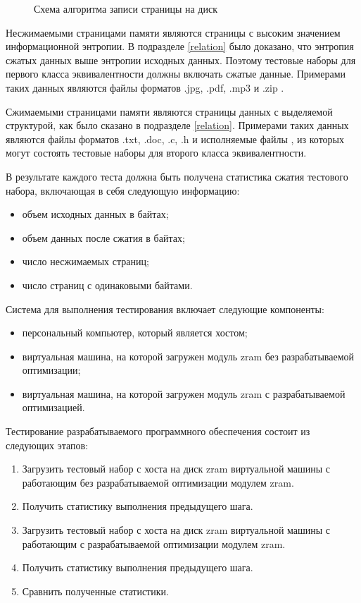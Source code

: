 \begin{figure}[H]
\begin{center}
	\end{center}
	\captionsetup{justification=centering}
	\caption{Схема алгоритма записи страницы на диск}
	\label{img:write-page}
\end{figure}

Несжимаемыми страницами памяти являются страницы с высоким значением информационной энтропии. В подразделе \ref{relation} было доказано, что энтропия сжатых данных выше энтропии исходных данных. Поэтому тестовые наборы для первого класса эквивалентности должны включать сжатые данные. Примерами таких данных являются файлы форматов .jpg, .pdf, .mp3 и .zip \cite{formats}.

Сжимаемыми страницами памяти являются страницы данных с выделяемой структурой, как было сказано в подразделе \ref{relation}. Примерами таких данных являются файлы форматов .txt, .doc, .c, .h и исполняемые файлы \cite{good-compression}, из которых могут состоять тестовые наборы для второго класса эквивалентности.

В результате каждого теста должна быть получена статистика сжатия тестового набора, включающая в себя следующую информацию:

\begin{itemize}
	\item объем исходных данных в байтах;
	\item объем данных после сжатия в байтах;
	\item число несжимаемых страниц;
	\item число страниц с одинаковыми байтами.
\end{itemize}

Система для выполнения тестирования включает следующие компоненты:

\begin{itemize}
	\item персональный компьютер, который является хостом;
	\item виртуальная машина, на которой загружен модуль zram без разрабатываемой оптимизации;
	\item виртуальная машина, на которой загружен модуль zram с разрабатываемой оптимизацией.
\end{itemize}

Тестирование разрабатываемого программного обеспечения состоит из следующих этапов:

\begin{enumerate}
	\item Загрузить тестовый набор с хоста на диск zram виртуальной машины с работающим без разрабатываемой оптимизации модулем zram.
	\item Получить статистику выполнения предыдущего шага.
	\item Загрузить тестовый набор с хоста на диск zram виртуальной машины с работающим с разрабатываемой оптимизации модулем zram.
	\item Получить статистику выполнения предыдущего шага.
	\item Сравнить полученные статистики.
\end{enumerate}

